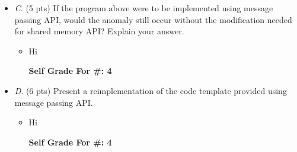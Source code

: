 \documentclass[conference]{IEEEtran}
\begin{document}
\begin{itemize}
	\item \textit{C}. (5 pts) If the program above were to be implemented using message passing API, would the
	anomaly still occur without the modification needed for shared memory API? Explain your
	answer.
	\begin{itemize} 
	\item Hi
		\begin{center}
			\textbf{Self Grade For \#: 4}
		\end{center}
	\end{itemize}
\end{itemize}

\begin{itemize}
\item \textit{D}. (6 pts) Present a reimplementation of the code template provided using message passing
API.
	\begin{itemize} 
	\item Hi
		\begin{center}
			\textbf{Self Grade For \#: 4}
		\end{center}
	\end{itemize}
\end{itemize}

\end{document}
